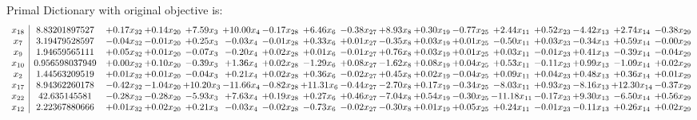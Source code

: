 \documentclass[9pt]{article}
\begin{document}
Primal Dictionary with original objective is:
\[\begin{array}{c| c c@{\hskip 2pt} c@{\hskip 2pt} c@{\hskip 2pt} c@{\hskip 2pt} c@{\hskip 2pt} c@{\hskip 2pt} c@{\hskip 2pt} c@{\hskip 2pt} c@{\hskip 2pt} c@{\hskip 2pt} c@{\hskip 2pt} c@{\hskip 2pt} c@{\hskip 2pt} c@{\hskip 2pt} c@{\hskip 2pt} }
 x_{18}   &  8.83201897527 & +  0.17 x_{32} & +  0.14 x_{20} & +  7.59 x_{3} & + 10.00 x_{4} & -0.17 x_{28} & +  6.46 x_{6} & -0.38 x_{27} & +  8.93 x_{8} & +  0.30 x_{19} & -0.77 x_{25} & +  2.44 x_{11} & +  0.52 x_{23} & -4.42 x_{13} & +  2.74 x_{14} & -0.38 x_{29}\\
 x_{7}   &  3.19479528597 & -0.04 x_{32} & -0.01 x_{20} & +  0.25 x_{3} & -0.03 x_{4} & -0.01 x_{28} & +  0.33 x_{6} & +  0.01 x_{27} & -0.35 x_{8} & +  0.03 x_{19} & +  0.01 x_{25} & -0.50 x_{11} & +  0.03 x_{23} & -0.34 x_{13} & +  0.59 x_{14} & -0.00 x_{29}\\
 x_{9}   &  1.94659565111 & +  0.05 x_{32} & +  0.01 x_{20} & -0.07 x_{3} & -0.20 x_{4} & +  0.02 x_{28} & +  0.01 x_{6} & -0.01 x_{27} & +  0.76 x_{8} & +  0.03 x_{19} & +  0.01 x_{25} & +  0.03 x_{11} & -0.01 x_{23} & +  0.41 x_{13} & -0.39 x_{14} & -0.04 x_{29}\\
 x_{10}   &  0.956598037949 & +  0.00 x_{32} & +  0.10 x_{20} & -0.39 x_{3} & +  1.36 x_{4} & +  0.02 x_{28} & -1.29 x_{6} & +  0.08 x_{27} & -1.62 x_{8} & +  0.08 x_{19} & +  0.04 x_{25} & +  0.53 x_{11} & -0.11 x_{23} & +  0.99 x_{13} & -1.09 x_{14} & +  0.02 x_{29}\\
 x_{2}   &  1.44563209519 & +  0.01 x_{32} & +  0.01 x_{20} & -0.04 x_{3} & +  0.21 x_{4} & +  0.02 x_{28} & +  0.36 x_{6} & -0.02 x_{27} & +  0.45 x_{8} & +  0.02 x_{19} & -0.04 x_{25} & +  0.09 x_{11} & +  0.04 x_{23} & +  0.48 x_{13} & +  0.36 x_{14} & +  0.01 x_{29}\\
 x_{17}   &  8.94362260178 & -0.42 x_{32} & -1.04 x_{20} & + 10.20 x_{3} & -11.66 x_{4} & -0.82 x_{28} & + 11.31 x_{6} & -0.44 x_{27} & -2.70 x_{8} & +  0.17 x_{19} & -0.34 x_{25} & -8.03 x_{11} & +  0.93 x_{23} & -8.16 x_{13} & + 12.30 x_{14} & -0.37 x_{29}\\
 x_{22}   &  42.635145581 & -0.28 x_{32} & -0.28 x_{20} & -5.93 x_{3} & +  7.63 x_{4} & +  0.19 x_{28} & +  0.27 x_{6} & +  0.46 x_{27} & -7.04 x_{8} & +  0.54 x_{19} & -0.30 x_{25} & -11.18 x_{11} & -0.17 x_{23} & +  9.30 x_{13} & -6.50 x_{14} & +  0.56 x_{29}\\
 x_{12}   &  2.22367880666 & +  0.01 x_{32} & +  0.02 x_{20} & +  0.21 x_{3} & -0.03 x_{4} & -0.02 x_{28} & -0.73 x_{6} & -0.02 x_{27} & -0.30 x_{8} & +  0.01 x_{19} & +  0.05 x_{25} & +  0.24 x_{11} & -0.01 x_{23} & -0.11 x_{13} & +  0.26 x_{14} & +  0.02 x_{29}\\

\end{array}\]
\end{document}

